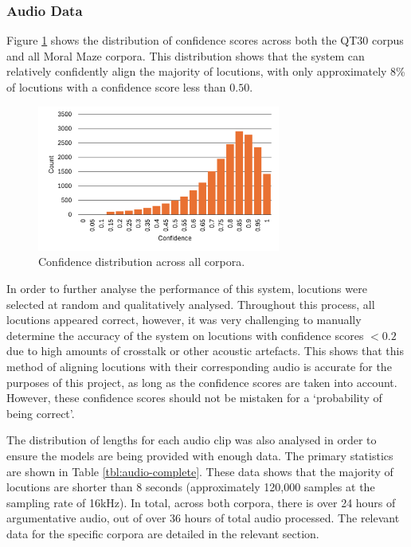 \documentclass[twocolumn]{article}
\begin{document}
\subsubsection{Audio Data}\label{sec:datasets-audio}

Figure \ref{fig:complete-confidence} shows the distribution of
confidence scores across both the QT30 corpus and all Moral Maze
corpora. This distribution shows that the system can relatively
confidently align the majority of locutions, with only approximately 8\%
of locutions with a confidence score less than \(0.50\).

\begin{figure}[h!]
\centering
\includegraphics[width=8cm]{complete-confidence}
\caption{Confidence distribution across all corpora. \label{fig:complete-confidence}}
\end{figure}

In order to further analyse the performance of this system, locutions
were selected at random and qualitatively analysed. Throughout this
process, all locutions appeared correct, however, it was very
challenging to manually determine the accuracy of the system on
locutions with confidence scores \(<0.2\) due to high amounts of
crosstalk or other acoustic artefacts. This shows that this method of
aligning locutions with their corresponding audio is accurate for the
purposes of this project, as long as the confidence scores are taken
into account. However, these confidence scores should not be mistaken
for a `probability of being correct'.

The distribution of lengths for each audio clip was also analysed in
order to ensure the models are being provided with enough data. The
primary statistics are shown in Table \ref{tbl:audio-complete}. These
data shows that the majority of locutions are shorter than 8 seconds
(approximately 120,000 samples at the sampling rate of 16kHz). In total,
across both corpora, there is over 24 hours of argumentative audio, out
of over 36 hours of total audio processed. The relevant data for the
specific corpora are detailed in the relevant section.
\end{document}
